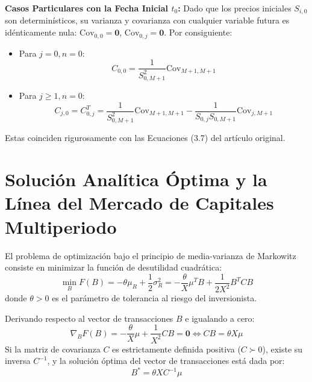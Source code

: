 \documentclass[11pt,a4paper]{report}
\numberwithin{equation}{chapter}
\begin{document}
\begin{demobox}
\textbf{Casos Particulares con la Fecha Inicial $t_0$:}
Dado que los precios iniciales $S_{i,0}$ son determinísticos, su varianza y covarianza con cualquier variable futura es idénticamente nula: $\mathrm{Cov}_{0,0} = \mathbf{0}$, $\mathrm{Cov}_{0,j} = \mathbf{0}$. Por consiguiente:
\begin{itemize}
    \item Para $j=0, n=0$:
    \begin{equation}
        \boxed{C_{0,0} = \frac{1}{S_{0,M+1}^2} \mathrm{Cov}_{M+1,M+1}}
    \end{equation}
    \item Para $j \ge 1, n=0$:
    \begin{equation}
        \boxed{C_{j,0} = C_{0,j}^T = \frac{1}{S_{0,M+1}^2} \mathrm{Cov}_{M+1,M+1} - \frac{1}{S_{0,j} S_{0,M+1}} \mathrm{Cov}_{j,M+1}}
    \end{equation}
\end{itemize}
Estas coinciden rigurosamente con las Ecuaciones (3.7) del artículo original.
\end{demobox}

\section{Solución Analítica Óptima y la Línea del Mercado de Capitales Multiperiodo}

El problema de optimización bajo el principio de media-varianza de Markowitz consiste en minimizar la función de desutilidad cuadrática:
\begin{equation}
    \min_B F(B) = -\theta \mu_R + \frac{1}{2} \sigma_R^2 = -\frac{\theta}{X} \mu^T B + \frac{1}{2 X^2} B^T C B \label{eq:F_B_Markowitz}
\end{equation}
donde $\theta > 0$ es el parámetro de tolerancia al riesgo del inversionista.

Derivando respecto al vector de transacciones $B$ e igualando a cero:
\begin{equation}
    \nabla_B F(B) = -\frac{\theta}{X} \mu + \frac{1}{X^2} C B = \mathbf{0} \iff \boxed{C B = \theta X \mu} \label{eq:FOC_B}
\end{equation}
Si la matriz de covarianza $C$ es estrictamente definida positiva ($C \succ 0$), existe su inversa $C^{-1}$, y la solución óptima del vector de transacciones está dada por:
\begin{equation}
    \boxed{B^* = \theta X C^{-1} \mu} \label{eq:B_optimo}
\end{equation}
\end{document}
